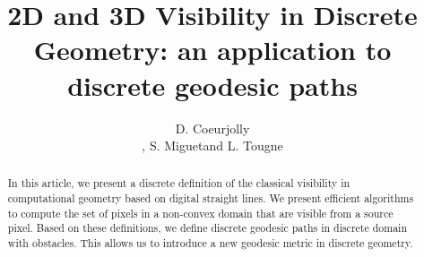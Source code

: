 \documentclass[fleqn,twoside]{article}
\title{2D and 3D Visibility in Discrete Geometry: an application to  discrete geodesic paths}
\author{D. Coeurjolly\address[ERIC]{Laboratoire ERIC\\ Universit{\'e} Lumi{\`e}re Lyon 2\\ 5,  av. Pierre Mend{\`e}s-France \\ 69676 BRON cedex, FRANCE}, S. Miguet\addressmark[ERIC] and L. Tougne\addressmark[ERIC]}
\begin{document}
\begin{abstract}
In this  article, we present  a discrete  definition of the  classical
visibility in computational geometry  based on digital straight lines.
We   present efficient algorithms to  compute  the set  of pixels in a
non-convex domain  that are  visible from a  source pixel.    Based on
these   definitions, we define   discrete geodesic  paths  in discrete
domain with obstacles.  This allows   us to introduce a new   geodesic
metric in discrete geometry.  \vspace{1pc}
\end{abstract}

\maketitle










\end{document}

